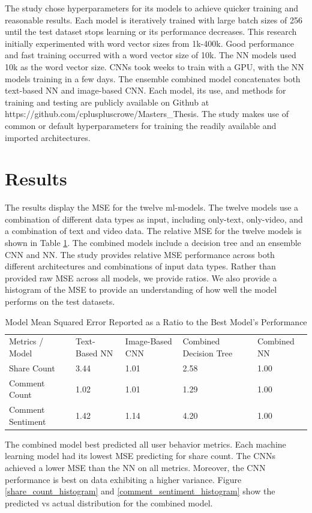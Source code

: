 \documentclass[mksc,blindrev]{informs3} %
\begin{document}
The study chose hyperparameters for its models to achieve quicker training and reasonable results. Each model is iteratively trained with large batch sizes of 256 until the test dataset stops learning or its performance decreases. This research initially experimented with word vector sizes from 1k-400k. Good performance and fast training occurred with a word vector size of 10k. The NN models used 10k as the word vector size. CNNs took weeks to train with a GPU, with the NN models training in a few days. The ensemble combined model concatenates both text-based NN and image-based CNN. Each model, its use, and methods for training and testing are publicly available on Github at https://github.com/cpluspluscrowe/Masters\_Thesis. The study makes use of common or default hyperparameters for training the readily available and imported architectures.

\section{Results}

The results display the MSE for the twelve ml-models. The twelve models use a combination of different data types as input, including only-text, only-video, and a combination of text and video data. The relative MSE for the twelve models is shown in Table \ref{mse_ratios}. The combined models include a decision tree and an ensemble CNN and NN. The study provides relative MSE performance across both different architectures and combinations of input data types. Rather than provided raw MSE across all models, we provide ratios.  We also provide a histogram of the MSE to provide an understanding of how well the model performs on the test datasets.

\begin{table}[]
\centering
\begin{tabular}{lllll}
Metrics / Model & Text-Based NN & Image-Based CNN & Combined Decision Tree & Combined NN \\
Share Count       & 3.44 & 1.01 & 2.58 & 1.00 \\
Comment Count     & 1.02 & 1.01 & 1.29 & 1.00 \\
Comment Sentiment & 1.42 & 1.14 & 4.20 & 1.00
\end{tabular}
\caption{\label{mse_ratios}Model Mean Squared Error Reported as a Ratio to the Best Model's Performance}
\end{table}

The combined model best predicted all user behavior metrics. Each machine learning model had its lowest MSE predicting for share count. The CNNs achieved a lower MSE than the NN on all metrics. Moreover, the CNN performance is best on data exhibiting a higher variance. Figure \ref{share_count_histogram} and \ref{comment_sentiment_histogram} show the predicted vs actual distribution for the combined model.
\end{document}
